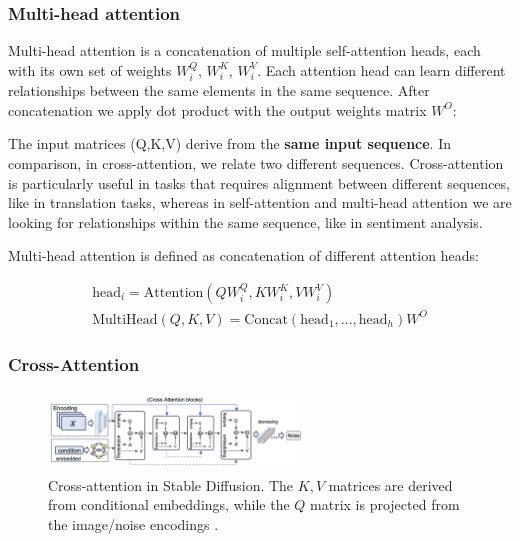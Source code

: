 \subsubsection{Multi-head attention}

Multi-head attention is a concatenation of multiple self-attention heads, each with its own set of weights $W_i^Q$, $W_i^K$, $W_i^V$. Each attention head can learn different relationships between the same elements in the same sequence. After concatenation we apply dot product with the output weights matrix $W^O$:

The input matrices (Q,K,V) derive from the \textbf{same input sequence}. In comparison, in cross-attention, we relate two different sequences. Cross-attention is particularly useful in tasks that requires alignment between different sequences, like in translation tasks, whereas in self-attention and multi-head attention we are looking for relationships within the same sequence, like in sentiment analysis.

Multi-head attention is defined as concatenation of different attention heads:

\begin{equation}
    \begin{aligned}
        \text{head}_i = \text{Attention}(QW_i^Q, KW_i^K, VW_i^V)  \\
        \text{MultiHead}(Q, K, V) = \text{Concat}(\text{head}_1, ..., \text{head}_h)W^O
    \end{aligned}
\end{equation}














\subsubsection{Cross-Attention}

\begin{figure}[ht]
    \centering
    \includegraphics[width=0.6\textwidth]{images/diffusion_models/stable_diffusion/cross_attention.png}
    \caption{Cross-attention in Stable Diffusion. The $K,V$ matrices are derived from conditional embeddings, while the $Q$ matrix is projected from the image/noise encodings \cite{sun2024sora}.}
    \label{fig:cross_attention}
\end{figure}

